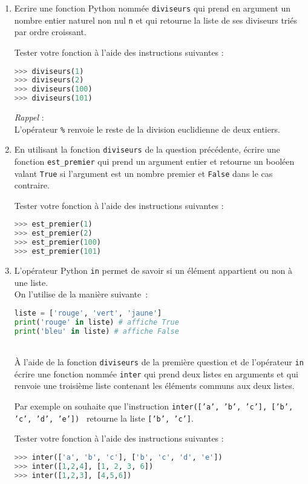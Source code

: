 
\begin{enumerate}
\item
Ecrire une fonction Python nommée  \texttt{diviseurs} qui prend en argument un nombre entier naturel non nul  \texttt{n} et qui retourne la liste de ses diviseurs triés par ordre croissant.
\par
Tester votre fonction à l'aide des instructions suivantes :
\begin{lstlisting}[language=Python]
>>> diviseurs(1)
>>> diviseurs(2)
>>> diviseurs(100)
>>> diviseurs(101)
\end{lstlisting}
\par
 \textit{Rappel} : 
\\
L'opérateur  \texttt{\%}  renvoie le reste de la division euclidienne de deux entiers.  

\item
En utilisant la fonction \texttt{diviseurs} de la question précédente, écrire une fonction  \texttt{est_premier} qui prend un argument entier et retourne un booléen valant  \texttt{True} si l'argument est un nombre premier et  \texttt{False} dans le cas contraire.
\par
Tester votre fonction à l'aide des instructions suivantes :
\begin{lstlisting}[language=Python]
>>> est_premier(1)
>>> est_premier(2)
>>> est_premier(100)
>>> est_premier(101)
\end{lstlisting}

\item
L'opérateur Python  \texttt{in} permet de savoir si un élément appartient ou non à une liste. 
\\
On l'utilise de la manière suivante~: 
\begin{lstlisting}[language=Python]
liste = ['rouge', 'vert', 'jaune']
print('rouge' in liste) # affiche True
print('bleu' in liste) # affiche False
\end{lstlisting}
\\
 À l'aide de la fonction \texttt{diviseurs} de la première question et de l'opérateur  \texttt{in} écrire une fonction nommée  \texttt{inter} qui prend deux listes en arguments et qui renvoie une troisième liste contenant les éléments communs aux deux listes.
\par
Par exemple on souhaite que l'instruction \texttt{inter(['a', 'b', 'c'], ['b', 'c', 'd', 'e']) } retourne la liste  \texttt{['b', 'c']}.  
 \par
Tester votre fonction à l'aide des instructions suivantes :
\begin{lstlisting}[language=Python]
>>> inter(['a', 'b', 'c'], ['b', 'c', 'd', 'e'])
>>> inter([1,2,4], [1, 2, 3, 6])
>>> inter([1,2,3], [4,5,6])
\end{lstlisting}


\end{enumerate}
